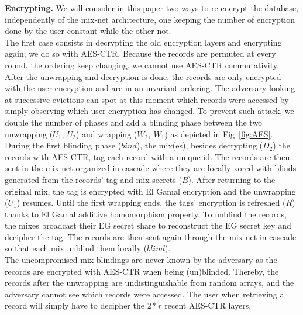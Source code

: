 \documentclass{llncs}
\begin{document}
\noindent\textbf{Encrypting.} We will consider in this paper two ways to re-encrypt the database, independently of the mix-net architecture, one keeping the number of encryption done by the user constant while the other not.\\
The first case consists in decrypting the old encryption layers and encrypting again, we do so with AES-CTR. Because the records are permuted at every round, the ordering keep changing, we cannot use AES-CTR commutativity. After the unwrapping and decryption is done, the records are only encrypted with the user encryption and are in an invariant ordering. The adversary looking at successive evictions can spot at this moment which records were accessed by simply observing which user encryption has changed. To prevent such attack, we double the number of phases and add a blinding phase between the two unwrapping ($U_1,\ U_2$) and wrapping ($W_2,\ W_1$) as depicted in Fig~\ref{fig:AES}.\\
During the first blinding phase ($bind$), the mix(es), besides decrypting ($D_2$) the records with AES-CTR, tag each record with a unique id. The records are then sent in the mix-net organized in cascade where they are locally xored with blinds generated from the records' tag and mix secrets ($B$). After returning to the original mix, the tag is encrypted with El Gamal encryption and the unwrapping ($U_1$) resumes. Until the first wrapping ends, the tags' encryption is refreshed ($R$) thanks to El Gamal additive homomorphism property. To unblind the records, the mixes broadcast their EG secret share to reconstruct the EG secret key and decipher the tag. The records are then sent again through the mix-net in cascade so that each mix unblind them locally ($blind$).\\
The uncompromised mix blindings are never known by the adversary as the records are encrypted with AES-CTR when being (un)blinded. Thereby, the records after the unwrapping are undistinguishable from random arrays, and the adversary cannot see which records were accessed.
The user when retrieving a record will simply have to decipher the $2*r$ recent AES-CTR layers.
\end{document}
